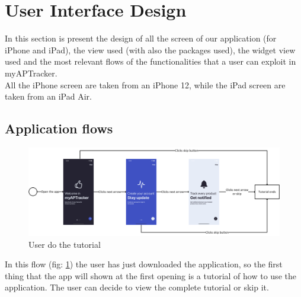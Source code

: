 \section{User Interface Design}

In this section is present the design of all the screen of our application (for iPhone and iPad), the view used (with also the packages used), the widget view used and the most relevant flows of the functionalities that a user can exploit in myAPTracker.\\
All the iPhone screen are taken from an iPhone 12, while the iPad screen are taken from an iPad Air.

\subsection{Application flows}
\label{subsection:application_flows}

\begin{figure}[h!]
        \centering
        \includegraphics[scale=0.12]{images/interfaces/user_do_tutorial.png}
        \caption{User do the tutorial}
        \label{fig:user_do_tutorial}
\end{figure}
\FloatBarrier
In this flow (fig: \ref{fig:user_do_tutorial}) the user has just downloaded the application, so the first thing that the app will shown at the first opening is a tutorial of how to use the application. The user can decide to view the complete tutorial or skip it.

